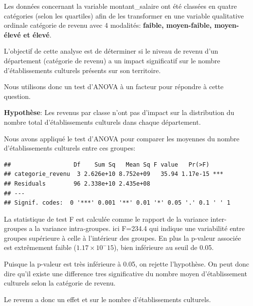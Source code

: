 \documentclass[mstat,12pt]{unswthesis}
\begin{document}
\medskip

Les données concernant la variable montant\_salaire ont été classées en
quatre catégories (selon les quartiles) afin de les transformer en une
variable qualitative ordinale catégorie de revenu avec 4 modalités:
\textbf{faible, moyen-faible, moyen-élevé et élevé}.

\medskip

L'objectif de cette analyse est de déterminer si le niveau de revenu
d'un département (catégorie de revenu) a un impact significatif sur le
nombre d'établissements culturels présents sur son territoire.

\medskip

Nous utilisons donc un test d'ANOVA à un facteur pour répondre à cette
question.

\medskip

\textbf{Hypothèse}: Les revenus par classe n'ont pas d'impact sur la
distribution du nombre total d'établissements culturels dans chaque
département.

\medskip

Nous avons appliqué le test d'ANOVA pour comparer les moyennes du nombre
d'établissements culturels entre ces groupes:

\bigskip

\begin{verbatim}
##                  Df    Sum Sq   Mean Sq F value   Pr(>F)    
## categorie_revenu  3 2.626e+10 8.752e+09   35.94 1.17e-15 ***
## Residuals        96 2.338e+10 2.435e+08                     
## ---
## Signif. codes:  0 '***' 0.001 '**' 0.01 '*' 0.05 '.' 0.1 ' ' 1
\end{verbatim}

\medskip

La statistique de test F est calculée comme le rapport de la variance
inter-groupes a la variance intra-groupes. ici F=234.4 qui indique une
variabilité entre groupes supérieure à celle à l'intérieur des groupes.
En plus la p-valeur associée est extrêmement faible
(\(1.17 × 10^-{15}\)), bien inférieure au seuil de 0.05.

\medskip

Puisque la p-valeur est très inférieure à 0.05, on rejette l'hypothèse.
On peut donc dire qu'il existe une difference tres significative du
nombre moyen d'établissement culturels selon la catégorie de revenu.

\medskip

Le revenu a donc un effet et sur le nombre d'établissements culturels.
\end{document}
